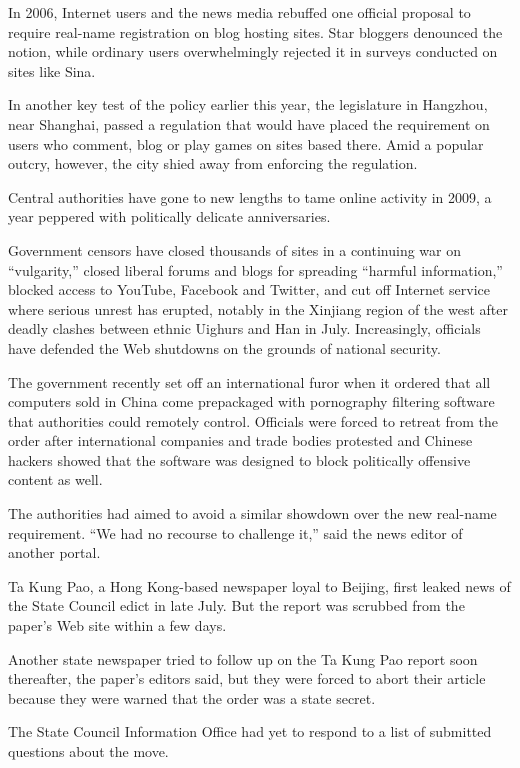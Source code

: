 ﻿\documentclass[12pt]{article}
\begin{document}
In 2006, Internet users and the news media rebuffed one official proposal to require real-name
registration on blog hosting sites. Star bloggers denounced the notion, while ordinary users
overwhelmingly rejected it in surveys conducted on sites like Sina.

In another key test of the policy earlier this year, the legislature in Hangzhou, near Shanghai,
passed a regulation that would have placed the requirement on users who comment, blog or play games
on sites based there. Amid a popular outcry, however, the city shied away from enforcing the
regulation.

Central authorities have gone to new lengths to tame online activity in 2009, a year peppered with
politically delicate anniversaries.

Government censors have closed thousands of sites in a continuing war on ``vulgarity,'' closed
liberal forums and blogs for spreading ``harmful information,'' blocked access to YouTube, Facebook
and Twitter, and cut off Internet service where serious unrest has erupted, notably in the Xinjiang
region of the west after deadly clashes between ethnic Uighurs and Han in July. Increasingly,
officials have defended the Web shutdowns on the grounds of national security.

The government recently set off an international furor when it ordered that all computers sold in
China come prepackaged with pornography filtering software that authorities could remotely control.
Officials were forced to retreat from the order after international companies and trade bodies
protested and Chinese hackers showed that the software was designed to block politically offensive
content as well.

The authorities had aimed to avoid a similar showdown over the new real-name requirement. ``We had
no recourse to challenge it,'' said the news editor of another portal.

Ta Kung Pao, a Hong Kong-based newspaper loyal to Beijing, first leaked news of the State Council
edict in late July. But the report was scrubbed from the paper's Web site within a few days.

Another state newspaper tried to follow up on the Ta Kung Pao report soon thereafter, the paper's
editors said, but they were forced to abort their article because they were warned that the order
was a state secret.

The State Council Information Office had yet to respond to a list of submitted questions about the
move.
\end{document}
